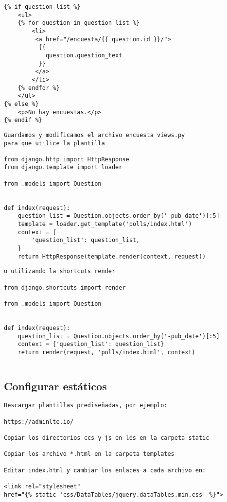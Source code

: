 \documentclass[xcolor=dvipsnames]{beamer}
\begin{document}
\begin{frame}[fragile]
\begin{verbatim}
{% if question_list %}
    <ul>
    {% for question in question_list %}
        <li>
         <a href="/encuesta/{{ question.id }}/">
          {{
            question.question_text
          }}
         </a>
        </li>
    {% endfor %}
    </ul>
{% else %}
    <p>No hay encuestas.</p>
{% endif %}
\end{verbatim}
\end{frame}

\begin{frame}[fragile]
\begin{verbatim}
Guardamos y modificamos el archivo encuesta views.py 
para que utilice la plantilla

from django.http import HttpResponse
from django.template import loader

from .models import Question


def index(request):
    question_list = Question.objects.order_by('-pub_date')[:5]
    template = loader.get_template('polls/index.html')
    context = {
        'question_list': question_list,
    }
    return HttpResponse(template.render(context, request))

\end{verbatim}
\end{frame}

\begin{frame}[fragile]
\begin{verbatim}
o utilizando la shortcuts render

from django.shortcuts import render

from .models import Question


def index(request):
    question_list = Question.objects.order_by('-pub_date')[:5]
    context = {'question_list': question_list}
    return render(request, 'polls/index.html', context)


\end{verbatim}
\end{frame}

\subsection{Configurar estáticos}
\begin{frame}[fragile]
\begin{verbatim}
Descargar plantillas prediseñadas, por ejemplo:

https://adminlte.io/

Copiar los directorios ccs y js en los en la carpeta static

Copiar los archivo *.html en la carpeta templates

Editar index.html y cambiar los enlaces a cada archivo en:

<link rel="stylesheet" 
href="{% static 'css/DataTables/jquery.dataTables.min.css' %}">

\end{verbatim}
\end{frame}
\end{document}
